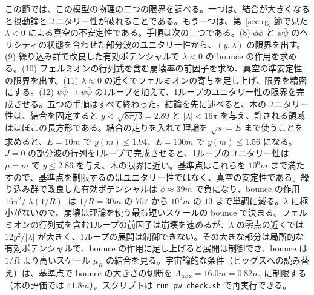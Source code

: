 \documentclass[a4paper,10pt]{ltjsarticle}
\begin{document}
この節では、この模型の物理の二つの限界を調べる。一つは、結合が大きくなると摂動論とユニタリー性が破れることである。もう一つは、第~\ref{sec:rg} 節で見た $\lambda<0$ による真空の不安定性である。手順は次の三つである。(8) $\phi\phi$ と $\psi\bar\psi$ のヘリシティの状態を合わせた部分波のユニタリー性から、$(y,\lambda)$ の限界を出す。(9) 繰り込み群で改良した有効ポテンシャルで $\lambda<0$ の bounce の作用を求める。(10) フェルミオンの行列式を含む崩壊率の前因子を求め、真空の準安定性の限界を出す。(11) $\lambda\approx0$ の近くでフェルミオンの寄与を足し上げ、限界を精密にする。(12) $\psi\bar\psi\to\psi\bar\psi$ の1ループを加えて、1ループのユニタリー性の限界を完成させる。五つの手順はすべて終わった。結論を先に述べると、木のユニタリー性は、結合を固定すると $y<\sqrt{8\pi/3}=2.89$ と $|\lambda|<16\pi$ を与え、許される領域はほぼこの長方形である。結合の走りを入れて理論を $\sqrt s=E$ まで使うことを求めると、$E=10m$ で $y(m)\le1.94$、$E=100m$ で $y(m)\le1.56$ になる。$J=0$ の部分波の行列を1ループで完成させると、1ループのユニタリー性は $\mu=m$ で $y\le2.86$ を与え、木の限界に近い。基準点はこれらを $10^6m$ まで満たすので、基準点を制限するのはユニタリー性ではなく、真空の安定性である。繰り込み群で改良した有効ポテンシャルは $\phi\approx39m$ で負になり、bounce の作用 $16\pi^2/|\lambda(1/R)|$ は $1/R=30m$ の $757$ から $10^5m$ の $13$ まで単調に減る。$\lambda$ に極小がないので、崩壊は理論を使う最も短いスケールの bounce で決まる。フェルミオンの行列式を含む1ループの前因子は崩壊を速めるが、$\lambda$ の零点の近くでは $12y^2/|\lambda|$ が大きく、1ループの展開は制御できない。その大きな部分は局所的な有効ポテンシャルで、bounce の作用に足し上げると展開は制御でき、bounce は $1/R$ より高いスケール $\mu_R$ の結合を見る。宇宙論的な条件（ヒッグスへの読み替え）は、基準点で bounce の大きさの切断を $\Lambda_{\max}=16.0m=0.82\mu_0$ に制限する（木の評価では $41.8m$）。スクリプトは \texttt{run\_pw\_check.sh} で再実行できる。
\end{document}
